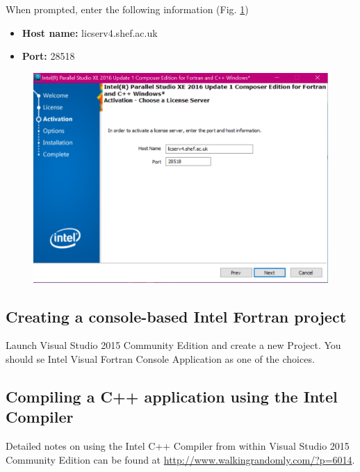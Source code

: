\documentclass[10pt,a4paper,oneside]{article}
\begin{document}
When prompted, enter the following information (Fig. \ref{fig:VS5})
\begin{itemize}
\item \textbf{Host name:} licserv4.shef.ac.uk
\item \textbf{Port:} 28518
\end{itemize}
\begin{figure}[ht]
\centering
\includegraphics[width=12cm]{license_intel.png}
\caption{}
\label{fig:VS5}
\end{figure}

\FloatBarrier

\subsection*{Creating a console-based Intel Fortran project}
Launch Visual Studio 2015 Community Edition and create a new Project. You should se Intel Visual Fortran Console Application as one of the choices. 

\subsection*{Compiling a C++ application using the Intel Compiler}
Detailed notes on using the Intel C++ 
Compiler from within Visual Studio 2015 Community Edition can be found at \url{http://www.walkingrandomly.com/?p=6014}.
\end{document}
